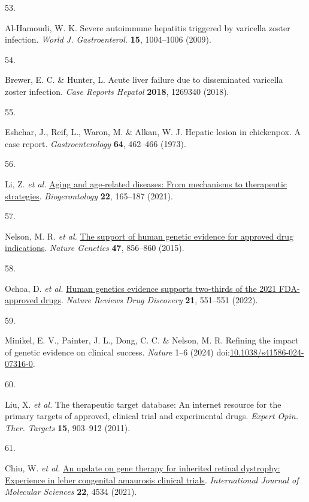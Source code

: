 \documentclass[
]{article}
\newlength{\cslhangindent}
\newlength{\csllabelwidth}
\newenvironment{CSLReferences}[2] %
 {\begin{list}{}{%
  \setlength{\itemindent}{0pt}
  \setlength{\leftmargin}{0pt}
  \setlength{\parsep}{0pt}
  \ifodd #1
   \setlength{\leftmargin}{\cslhangindent}
   \setlength{\itemindent}{-1\cslhangindent}
  \fi
  \setlength{\itemsep}{#2\baselineskip}}}
 {\end{list}}
\newcommand{\CSLLeftMargin}[1]{\parbox[t]{\csllabelwidth}{\strut#1\strut}}
\newcommand{\CSLRightInline}[1]{\parbox[t]{\linewidth - \csllabelwidth}{\strut#1\strut}}
\begin{document}
\begin{CSLReferences}{0}{0}
\CSLLeftMargin{53. }%
\CSLRightInline{Al-Hamoudi, W. K. Severe autoimmune hepatitis triggered
by varicella zoster infection. \emph{World J. Gastroenterol.}
\textbf{15}, 1004--1006 (2009).}

\CSLLeftMargin{54. }%
\CSLRightInline{Brewer, E. C. \& Hunter, L. Acute liver failure due to
disseminated varicella zoster infection. \emph{Case Reports Hepatol}
\textbf{2018}, 1269340 (2018).}

\CSLLeftMargin{55. }%
\CSLRightInline{Eshchar, J., Reif, L., Waron, M. \& Alkan, W. J. Hepatic
lesion in chickenpox. A case report. \emph{Gastroenterology}
\textbf{64}, 462--466 (1973).}

\CSLLeftMargin{56. }%
\CSLRightInline{Li, Z. \emph{et al.}
\href{https://doi.org/10.1007/s10522-021-09910-5}{Aging and age‐related
diseases: From mechanisms to therapeutic strategies}.
\emph{Biogerontology} \textbf{22}, 165--187 (2021).}

\CSLLeftMargin{57. }%
\CSLRightInline{Nelson, M. R. \emph{et al.}
\href{https://doi.org/10.1038/ng.3314}{The support of human genetic
evidence for approved drug indications}. \emph{Nature Genetics}
\textbf{47}, 856--860 (2015).}

\CSLLeftMargin{58. }%
\CSLRightInline{Ochoa, D. \emph{et al.}
\href{https://doi.org/10.1038/d41573-022-00120-3}{Human genetics
evidence supports two-thirds of the 2021 FDA-approved drugs}.
\emph{Nature Reviews Drug Discovery} \textbf{21}, 551--551 (2022).}

\CSLLeftMargin{59. }%
\CSLRightInline{Minikel, E. V., Painter, J. L., Dong, C. C. \& Nelson,
M. R. Refining the impact of genetic evidence on clinical success.
\emph{Nature} 1--6 (2024)
doi:\href{https://doi.org/10.1038/s41586-024-07316-0}{10.1038/s41586-024-07316-0}.}

\CSLLeftMargin{60. }%
\CSLRightInline{Liu, X. \emph{et al.} The therapeutic target database:
An internet resource for the primary targets of approved, clinical trial
and experimental drugs. \emph{Expert Opin. Ther. Targets} \textbf{15},
903--912 (2011).}

\CSLLeftMargin{61. }%
\CSLRightInline{Chiu, W. \emph{et al.}
\href{https://doi.org/10.3390/ijms22094534}{An update on gene therapy
for inherited retinal dystrophy: Experience in leber congenital
amaurosis clinical trials}. \emph{International Journal of Molecular
Sciences} \textbf{22}, 4534 (2021).}


\end{CSLReferences}
\end{document}
